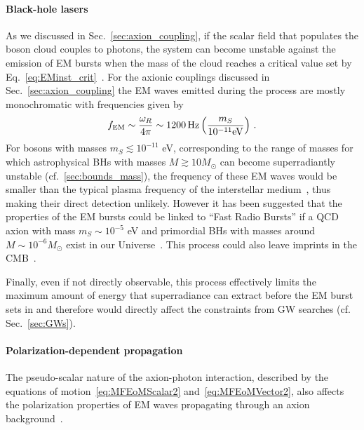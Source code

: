 \documentclass[11pt]{article}
\newcommand{\be}{\begin{equation}}
\newcommand{\ee}{\end{equation}}
\numberwithin{equation}{section} %
\begin{document}
\paragraph{Black-hole lasers}
As we discussed  in Sec.~\ref{sec:axion_coupling}, if the scalar field that populates the boson cloud couples to photons, the system can become unstable against the emission of EM bursts when the mass of the cloud reaches a critical value set by Eq.~\eqref{eq:EMinst_crit}~\cite{Ikeda:2019fvj,Boskovic:2018lkj}. 
For the axionic couplings discussed in Sec.~\ref{sec:axion_coupling} the EM waves emitted during the process are mostly monochromatic with frequencies given by~\cite{Rosa:2017ury,Sen:2018cjt,Ikeda:2019fvj,Boskovic:2018lkj}
%
\be
f_{\rm EM}\sim \frac{\omega_R}{4\pi} \sim 1200\,{\rm Hz}\left(\frac{m_S}{10^{-11}{\rm eV}}\right)\,.
\ee
%
For bosons with masses $m_S\lesssim 10^{-11}$ eV, corresponding to the range of masses for which astrophysical BHs with masses $M\gtrsim 10 M_{\odot}$ can become superradiantly unstable (cf.~\ref{sec:bounds_mass}), the frequency of these EM waves would be smaller than the typical plasma frequency of the interstellar medium~\cite{Sen:2018cjt,Boskovic:2018lkj}, thus making their direct detection unlikely. However it has been suggested that the properties of the EM bursts could be linked to ``Fast Radio Bursts'' if a QCD axion with mass $m_S\sim 10^{-5}$ eV and primordial BHs with masses around $M\sim 10^{-6} M_{\odot}$ exist in our Universe~\cite{Rosa:2017ury}. This process could also leave imprints in the CMB~\cite{Blas:2020nbs}.

Finally, even if not directly observable, this process effectively limits the maximum amount of energy that superradiance can extract before the EM burst sets in and therefore would directly affect the constraints from GW searches (cf. Sec.~\ref{sec:GWs}). 

\paragraph{Polarization-dependent propagation}

The pseudo-scalar nature of the axion-photon interaction, described by the equations of motion~\eqref{eq:MFEoMScalar2} and~\eqref{eq:MFEoMVector2}, also affects the polarization properties of EM waves propagating through an axion background~\cite{Plascencia:2017kca,Chen:2019fsq,Chigusa:2019rra}.
\end{document}
